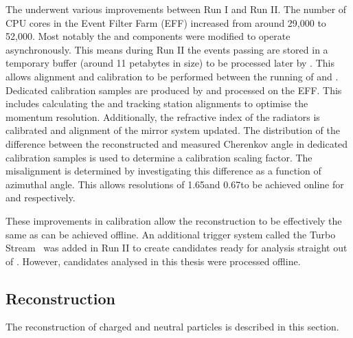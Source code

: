 The \hlt underwent various improvements between Run I and Run II. The number of CPU cores in the Event Filter Farm (EFF) increased from around 29,000 to 52,000. Most notably the \hltone and \hlttwo components were modified to operate asynchronously. This means during Run II the events passing \hltone are stored in a temporary buffer (around 11 petabytes in size) to be processed later by \hlttwo. This allows alignment and calibration to be performed between the running of \hltone and \hlttwo. Dedicated calibration samples are produced by \hltone and processed on the EFF. This includes calculating the \velo and tracking station alignments to optimise the momentum resolution. Additionally, the refractive index of the \rich radiators is calibrated and alignment of the \rich mirror system updated. 
The distribution of the difference between the reconstructed and measured Cherenkov angle in dedicated calibration samples is used to determine a calibration scaling factor. The misalignment is determined by investigating this difference as a function of azimuthal angle.
This allows resolutions of 1.65\mrad and 0.67\mrad to be achieved online for \richone and \richtwo respectively. 

These improvements in calibration allow the \hlttwo reconstruction to be effectively the same as can be achieved offline. An additional trigger system called the Turbo Stream~\cite{1742-6596-664-8-082004} was added in Run II to create candidates ready for analysis straight out of \hlttwo. However, candidates analysed in this thesis were processed offline.


\subsection{Reconstruction}
The reconstruction of charged and neutral particles is described in this section. 

